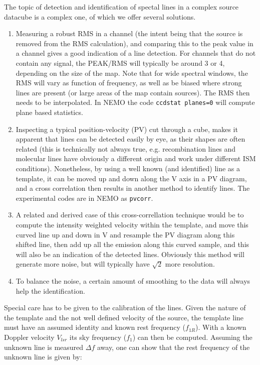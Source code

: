 \documentclass[preprint]{aastex} %
\begin{document}
The topic of detection and identification of spectal
lines in a complex source datacube is a complex one,
of which we offer several solutions. 

\begin{enumerate}

\item
Measuring a robust RMS in a channel (the intent being that the source is removed from the 
RMS calculation), and comparing this to the peak value in a channel gives a good 
indication of a line detection. For channels that do not contain any signal, 
the PEAK/RMS will typically be around 3 or 4, depending on the size of the map.
Note that for wide spectral windows, the RMS will vary as function of frequency,
as well as be biased where strong lines are present (or large areas of the map
contain sources). The RMS then needs to be interpolated. In NEMO the code
{\tt ccdstat planes=0} will compute plane based statistics.

\item
Inspecting a typical position-velocity (PV) cut through a cube, makes it apparent
that lines can be detected easily by eye, as their shapes are often related
(this is technically not always true, e.g. recombination lines and molecular lines have
obviously a different origin and work under different ISM conditions). Nonetheless,
by using a well known (and identified) line as a template, it can be moved up and down
along the V axis in a PV diagram, and a cross correlation then results in another method
to identify lines. The experimental codes are in NEMO as {\tt pvcorr}.


\item
A related and derived case of this
cross-correllation technique would be to compute the intensity
weighted velocity within the template, and move this curved line up and down in V and resample
the PV diagram along this shifted line, then add up all the emission along this curved
sample, and this will also be an indication of the detected lines.  Obviously this
method will generate more noise, but will typically have $\sqrt{2}$ more resolution.

\item
To balance the noise, a certain amount of smoothing to the data will always help
the identification.


\end{enumerate}

Special care has to be given to the calibration of the lines. Given the nature of
the template and the not well defined velocity of the source, the template line
must have an assumed identity and known rest frequency  ($f_{1R}$). 
With a known Doppler velocity $V_{lsr}$ its sky frequency ($f_1$) 
can then be computed.  Assuming the unknown line is measured ${\Delta f}$ away, one
can show that the rest frequency of the unknown line is given by:
\end{document}
